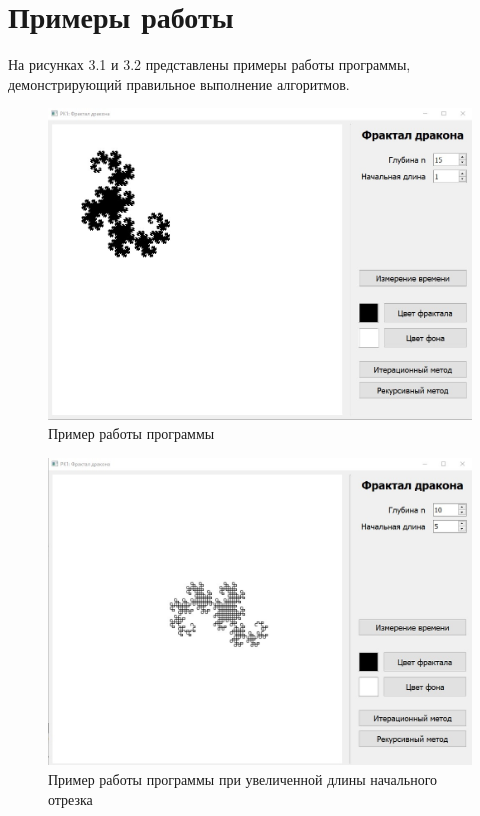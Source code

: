 \documentclass[12pt, a4paper]{report}
\begin{document}
	\section{Примеры работы}
	На рисунках 3.1 и 3.2 представлены примеры работы программы, демонстрирующий правильное выполнение алгоритмов.
	\begin{figure}[ht!]
		\centering
		\includegraphics[width=0.8\linewidth]{example_1.jpg}
		\caption{Пример работы программы}
		\label{fig:example}
	\end{figure}
	\begin{figure}[ht!]
		\centering
		\includegraphics[width=0.8\linewidth]{example_2.jpg}
		\caption{Пример работы программы при увеличенной длины начального отрезка}
		\label{fig:example2}
	\end{figure}
	
\end{document}
